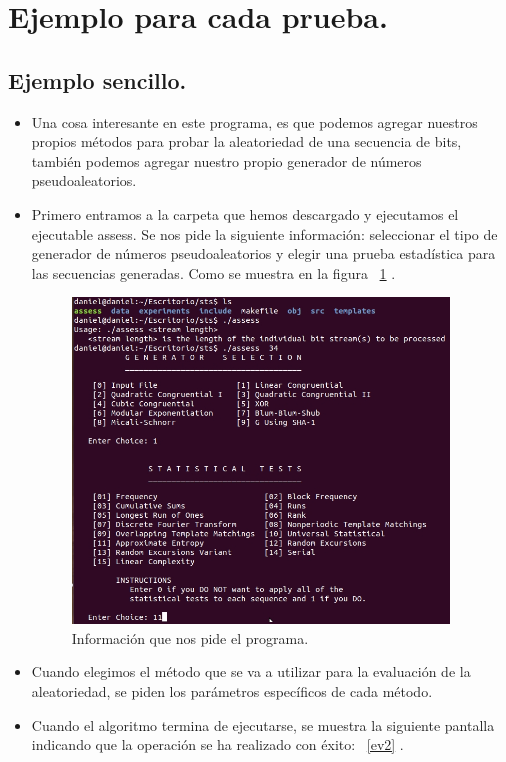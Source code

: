 \documentclass{llncs}
\theoremstyle{plane}
\begin{document}
\section{Ejemplo para cada prueba.}
\subsection{Ejemplo sencillo.}

\begin{itemize}
\item Una cosa interesante en este programa, es que podemos agregar nuestros propios métodos para probar la aleatoriedad de una secuencia de bits, también podemos agregar nuestro propio generador de números pseudoaleatorios. 

\item Primero entramos a la carpeta que hemos descargado y ejecutamos el ejecutable assess. Se nos pide la siguiente información: seleccionar el tipo de generador de números pseudoaleatorios y elegir una prueba estadística para las secuencias generadas. Como se muestra en la figura ~\ref{ev} .

\begin{figure}[h!]
\includegraphics[width=10cm]{prueba1.jpg}
\caption{Información que nos pide el programa.}
\label{ev}
\end{figure}

\item Cuando elegimos el método que se va a utilizar para la evaluación de la aleatoriedad, se piden los parámetros específicos de cada método. 

\item Cuando el algoritmo termina de ejecutarse, se muestra la siguiente pantalla indicando que la operación se ha realizado con éxito:
~\ref{ev2} .


\end{itemize}
\end{document}
